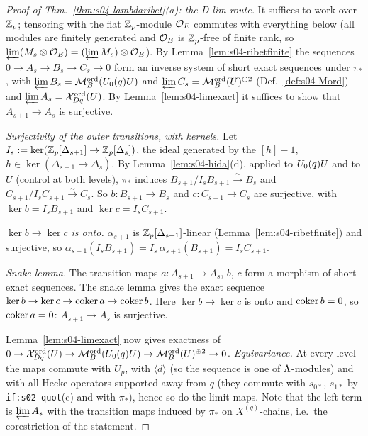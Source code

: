 \begin{proof}[Proof of Thm.~\ref{thm:s04-lambdaribet}(a): the D-lim route]
It suffices to work over $\mathbb{Z}_p$; tensoring with the flat $\mathbb{Z}_p$-module $\mathcal{O}_E$ commutes with everything below (all modules are
finitely generated and $\mathcal{O}_E$ is $\mathbb{Z}_p$-free of finite rank, so $\varprojlim(M_s\otimes\mathcal{O}_E)=(\varprojlim M_s)\otimes\mathcal{O}_E$).
By Lemma~\ref{lem:s04-ribetfinite} the sequences $0\to A_s\to B_s\to C_s\to0$ form an inverse system of short exact sequences
under $\pi_*$, with $\varprojlim B_s=\mathcal{M}^{\mathrm{ord}}_B(U_0(q)U)$ and $\varprojlim C_s=\mathcal{M}^{\mathrm{ord}}_B(U)^{\oplus2}$ (Def.~\ref{def:s04-Mord}) and
$\varprojlim A_s=\mathcal{X}^{\mathrm{ord}}_{Dq}(U)$. By Lemma~\ref{lem:s04-limexact} it suffices to show that $A_{s+1}\to A_s$ is surjective.

\emph{Surjectivity of the outer transitions, with kernels.} Let $I_s:=\ker(\mathbb{Z}_p[\Delta_{s+1}]\to\mathbb{Z}_p[\Delta_s])$, the ideal generated by
the $[h]-1$, $h\in\ker(\Delta_{s+1}\to\Delta_s)$. By Lemma~\ref{lem:s04-hida}(d), applied to $U_0(q)U$ and to $U$ (control at both
levels), $\pi_*$ induces $B_{s+1}/I_sB_{s+1}\xrightarrow{\sim}B_s$ and $C_{s+1}/I_sC_{s+1}\xrightarrow{\sim}C_s$. So
$b:B_{s+1}\to B_s$ and $c:C_{s+1}\to C_s$ are surjective, with $\ker b=I_sB_{s+1}$ and $\ker c=I_sC_{s+1}$.

\emph{$\ker b\to\ker c$ is onto.} $\alpha_{s+1}$ is $\mathbb{Z}_p[\Delta_{s+1}]$-linear (Lemma~\ref{lem:s04-ribetfinite}) and surjective, so
$\alpha_{s+1}(I_sB_{s+1})=I_s\,\alpha_{s+1}(B_{s+1})=I_sC_{s+1}$.

\emph{Snake lemma.} The transition maps $a:A_{s+1}\to A_s$, $b$, $c$ form a morphism of short exact sequences. The snake lemma gives
the exact sequence $\ker b\to\ker c\to\operatorname{coker} a\to\operatorname{coker} b$. Here $\ker b\to\ker c$ is onto and $\operatorname{coker} b=0$, so $\operatorname{coker} a=0$:
$A_{s+1}\to A_s$ is surjective.

Lemma~\ref{lem:s04-limexact} now gives exactness of $0\to\mathcal{X}^{\mathrm{ord}}_{Dq}(U)\to\mathcal{M}^{\mathrm{ord}}_B(U_0(q)U)\to\mathcal{M}^{\mathrm{ord}}_B(U)^{\oplus2}\to0$. \emph{Equivariance.}
At every level the maps commute with $U_p$, with $\langle d\rangle$ (so the sequence is one of $\Lambda$-modules) and with all Hecke
operators supported away from $q$ (they commute with $s_{0*}$, $s_{1*}$ by \texttt{if:s02-quot}(c) and with $\pi_*$), hence so do the
limit maps. Note that the left term is $\varprojlim A_s$ with the transition maps induced by $\pi_*$ on $X^{(q)}$-chains, i.e.\ the
corestriction of the statement.
\end{proof}

